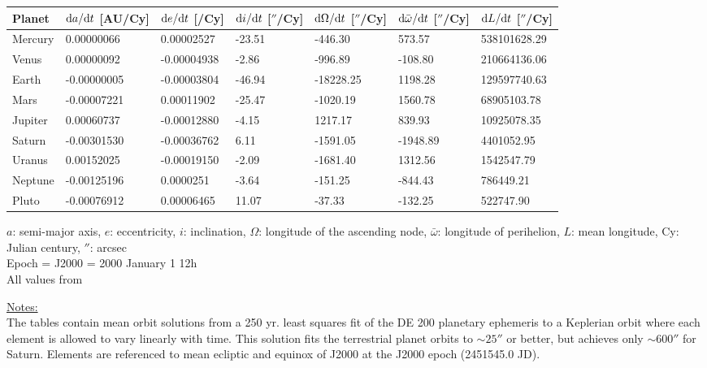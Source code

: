 \documentclass[Orbiter User Manual.tex]{subfiles}
\begin{document}
	\begin{longtable}{ p{} p{} p{}
		p{} p{} p{} p{} }
	\hline
	\textbf{Planet} & \textbf{$\mathrm{d} a/\mathrm{d} t$ [AU/Cy]} &
		\textbf{$\mathrm{d} e/\mathrm{d} t$ [/Cy]} &
		\textbf{$\mathrm{d} i/\mathrm{d} t$ [$''$/Cy]} &
		\textbf{$\mathrm{d}\Omega/\mathrm{d} t$ [$''$/Cy]} &
		\textbf{$\mathrm{d} \bar{\omega}/\mathrm{d} t$ [$''$/Cy]} &
		\textbf{$\mathrm{d} L/\mathrm{d} t$ [$''$/Cy]}\\
	\hline
	Mercury & 0.00000066 & 0.00002527 & -23.51 & -446.30 & 573.57 &
		538101628.29\\
	\hline
	Venus & 0.00000092 & -0.00004938 & -2.86 & -996.89 & -108.80 &
		210664136.06\\
	\hline
	Earth & -0.00000005 & -0.00003804 & -46.94 & -18228.25 & 1198.28 &
		129597740.63\\
	\hline
	Mars & -0.00007221 & 0.00011902 & -25.47 & -1020.19 & 1560.78 &
		68905103.78\\
	\hline
	Jupiter & 0.00060737 & -0.00012880 & -4.15 & 1217.17 & 839.93 &
		10925078.35 \\
	\hline
	Saturn & -0.00301530 & -0.00036762 & 6.11 & -1591.05 & -1948.89 &
		4401052.95\\
	\hline
	Uranus & 0.00152025 & -0.00019150 & -2.09 & -1681.40 & 1312.56 &
		1542547.79\\
	\hline
	Neptune & -0.00125196 & 0.0000251 & -3.64 & -151.25 & -844.43 & 786449.21\\
	\hline
	Pluto & -0.00076912 & 0.00006465 & 11.07 & -37.33 & -132.25 & 522747.90\\
	\hline
	\end{longtable}

$a$: semi-major axis, $e$: eccentricity, $i$: inclination, $\Omega$: longitude
of the ascending node, $\bar{\omega}$: longitude of perihelion, $L$: mean
longitude, Cy: Julian century, $''$: arcsec\\
Epoch = J2000 = 2000 January 1 12h\\
All values from \cite{seidelmann1992p316}

\underline{Notes:}\\
The tables contain mean orbit solutions from a 250 yr. least squares fit of the
DE 200 planetary ephemeris to a Keplerian orbit where each element is allowed to
vary linearly with time. This solution fits the terrestrial planet orbits to
$\sim 25''$ or better, but achieves only $\sim 600''$ for Saturn. Elements are
referenced to mean ecliptic and equinox of J2000 at the J2000 epoch (2451545.0
JD).
\end{document}
